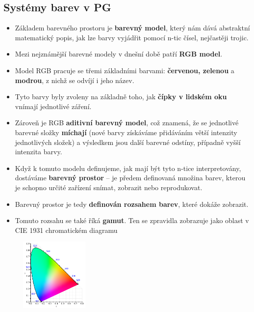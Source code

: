 \subsection{Systémy barev v PG}
\begin{itemize}
	\item Základem barevného prostoru je \textbf{barevný model}, který nám dává abstraktní matematický popis, jak lze barvy vyjádřit pomocí n-tic čísel, nejčastěji trojic. 
	\item Mezi nejznámější barevné modely v dnešní době patří \textbf{RGB model}. 
	\item Model RGB pracuje se třemi základními barvami: \textbf{červenou, zelenou} a \textbf{modrou}, z nichž se odvíjí i jeho název. 
	\item Tyto barvy byly zvoleny na základně toho, jak \textbf{čípky v lidském oku} vnímají jednotlivé záření. 
	\item Zároveň je RGB \textbf{aditivní barevný model}, což znamená, že se jednotlivé barevné složky \textbf{míchají} (nové barvy získáváme přidáváním větší intenzity jednotlivých složek) a výsledkem jsou další barevné odstíny, případně vyšší intenzita barvy.
	\item Když k tomuto modelu definujeme, jak mají být tyto n-tice interpretovány, dostáváme \textbf{barevný prostor} -- je předem definovaná množina barev, kterou je schopno určité zařízení snímat, zobrazit nebo reprodukovat. 
	\item Barevný prostor je tedy \textbf{definován rozsahem barev}, které dokáže zobrazit. 
	\item Tomuto rozsahu se také říká \textbf{gamut}. Ten se zpravidla zobrazuje jako oblast v CIE 1931 chromatickém diagramu 
\end{itemize}
\begin{figure}[H]
\centering
\includegraphics[width=0.3\textwidth]{assets/1_rgb_gamut}
\end{figure}
